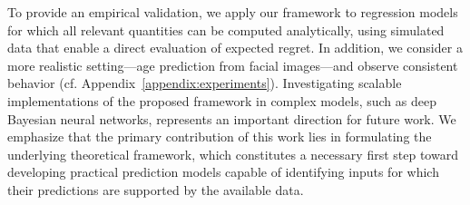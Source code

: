 \vspace{-0.05cm}
To provide an empirical validation, we apply our framework to regression models for which all relevant quantities can be computed analytically, using simulated data that enable a direct evaluation of expected regret. In addition, we consider a more realistic setting—age prediction from facial images—and observe consistent behavior (cf. Appendix~\ref{appendix:experiments}). Investigating scalable implementations of the proposed framework in complex models, such as deep Bayesian neural networks, represents an important direction for future work. We emphasize that the primary contribution of this work lies in formulating the underlying theoretical framework, which constitutes a necessary first step toward developing practical prediction models capable of identifying inputs for which their predictions are supported by the available data.




